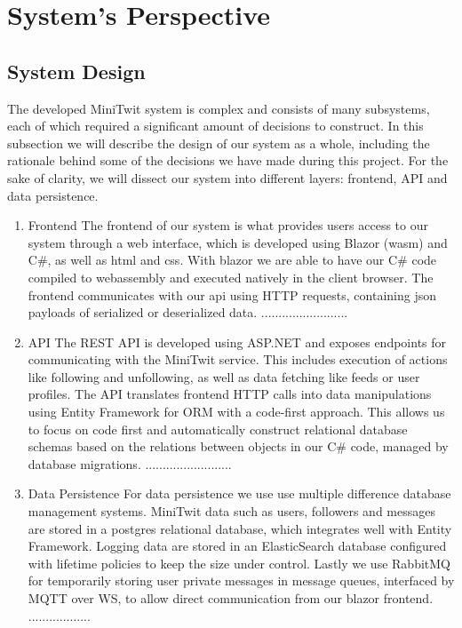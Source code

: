 \section{System's Perspective}
  \subsection{System Design}
  The developed MiniTwit system is complex and consists of many subsystems, each of which required a significant amount of decisions to construct.
  In this subsection we will describe the design of our system as a whole, including the rationale behind some of the decisions we have made during this project.
  \newline
  For the sake of clarity, we will dissect our system into different layers: frontend, API and data persistence.
  \begin{enumerate}
    \item Frontend\newline
    The frontend of our system is what provides users access to our system through a web interface, which is developed using Blazor (wasm) and C\#, as well as html and css.
    With blazor we are able to have our C\# code compiled to webassembly and executed natively in the client browser.
    The frontend communicates with our api using HTTP requests, containing json payloads of serialized or deserialized data.
    .........................

    \item API\newline
    The REST API is developed using ASP.NET and exposes endpoints for communicating with the MiniTwit service. 
    This includes execution of actions like following and unfollowing, as well as data fetching like feeds or user profiles.
    The API translates frontend HTTP calls into data manipulations using Entity Framework for ORM with a code-first approach.
    This allows us to focus on code first and automatically construct relational database schemas based on the relations between objects in our C\# code, managed by database migrations.
    .........................

    \item Data Persistence\newline
    For data persistence we use use multiple difference database management systems. 
    MiniTwit data such as users, followers and messages are stored in a postgres relational database, which integrates well with Entity Framework.
    Logging data are stored in an ElasticSearch database configured with lifetime policies to keep the size under control.
    Lastly we use RabbitMQ for temporarily storing user private messages in message queues, interfaced by MQTT over WS, to allow direct communication from our blazor frontend.
    ..................

  \end{enumerate}

